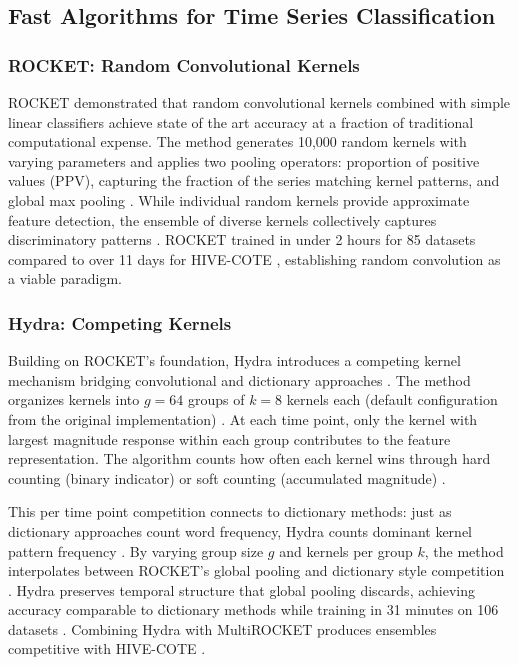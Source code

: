\documentclass[pdflatex,sn-basic]{sn-jnl}           %
\theoremstyle{thmstyleone}%
\theoremstyle{thmstyletwo}%
\theoremstyle{thmstylethree}%
\begin{document}
\subsection{Fast Algorithms for Time Series Classification}

\subsubsection{ROCKET: Random Convolutional Kernels}

ROCKET \citep{rocket} demonstrated that random convolutional kernels combined with simple linear classifiers achieve state of the art accuracy at a fraction of traditional computational expense. The method generates 10,000 random kernels with varying parameters and applies two pooling operators: proportion of positive values (PPV), capturing the fraction of the series matching kernel patterns, and global max pooling \citep[Section~3, pp.~1462--1463]{rocket}. While individual random kernels provide approximate feature detection, the ensemble of diverse kernels collectively captures discriminatory patterns \citep[p.~1455]{rocket}. ROCKET trained in under 2 hours for 85 datasets compared to over 11 days for HIVE-COTE \citep[p.~1455]{rocket}, establishing random convolution as a viable paradigm.

\subsubsection{Hydra: Competing Kernels}

Building on ROCKET's foundation, Hydra introduces a competing kernel mechanism bridging convolutional and dictionary approaches \citep{hydra}. The method organizes kernels into $g=64$ groups of $k=8$ kernels each (default configuration from the original implementation) \citep[Section~3.2, p.~1788]{hydra}. At each time point, only the kernel with largest magnitude response within each group contributes to the feature representation. The algorithm counts how often each kernel wins through hard counting (binary indicator) or soft counting (accumulated magnitude) \citep[Section~3.2, pp.~1789--1790]{hydra}.

This per time point competition connects to dictionary methods: just as dictionary approaches count word frequency, Hydra counts dominant kernel pattern frequency \citep[p.~1786]{hydra}. By varying group size $g$ and kernels per group $k$, the method interpolates between ROCKET's global pooling and dictionary style competition \citep[Figure~2, p.~1791]{hydra}. Hydra preserves temporal structure that global pooling discards, achieving accuracy comparable to dictionary methods while training in 31 minutes on 106 datasets \citep[p.~1781]{hydra}. Combining Hydra with MultiROCKET produces ensembles competitive with HIVE-COTE \citep[pp.~1796--1797]{hydra}.
\end{document}
